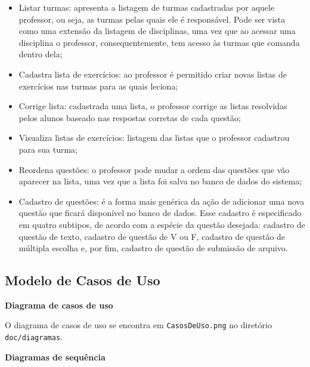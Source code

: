 \documentclass[12pt,letterpaper]{article}
\begin{document}
\begin{itemize}
\item{}Listar turmas: apresenta a listagem de turmas cadastradas por aquele professor, ou seja, as turmas pelas quais ele é responsável. Pode ser vista como uma extensão da listagem de disciplinas, uma vez que ao acessar uma disciplina o professor, consequentemente, tem acesso às turmas que comanda dentro dela;
\item{}Cadastra lista de exercícios: ao professor é permitido criar novas listas de exercícios nas turmas para as quais leciona;
\item{}Corrige lista: cadastrada uma lista, o professor corrige as listas resolvidas pelos alunos baseado nas respostas corretas de cada questão;
\item{}Visualiza listas de exercícios: listagem das listas que o professor cadastrou para sua turma;
\item{}Reordena questões: o professor pode mudar a ordem das questões que vão aparecer na lista, uma vez que a lista foi salva no banco de dados do sistema;
\item{}Cadastro de questões: é a forma mais genérica da ação de adicionar uma nova questão que ficará disponível no banco de dados. Esse cadastro é especificado em quatro subtipos, de acordo com a espécie da questão desejada: cadastro de questão de texto, cadastro de questão de V ou F, cadastro de questão de múltipla escolha e, por fim, cadastro de questão de submissão de arquivo.
\end{itemize}

\pagebreak

\subsection{Modelo de Casos de Uso}



\vspace{1cm}
{\large {\bf Diagrama de casos de uso}}
\vspace{0.5cm}

O diagrama de casos de uso se encontra em \texttt{CasosDeUso.png} no diretório \texttt{doc/diagramas}.

\vspace{1cm}
{\large {\bf Diagramas de sequência}}
\vspace{0.5cm}
\end{document}
